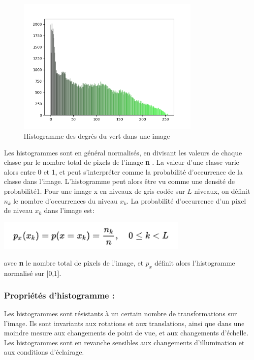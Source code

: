 \documentclass[a4paper,12pt]{report}
\begin{document}
\begin{figure}[ht]
	\centering
	\includegraphics[width=0.8\textwidth]{Figure_1.png}
	\caption{Histogramme des degrés du vert dans une image}
	\label{fig:my_label}
\end{figure}

Les histogrammes sont en général normalisés, en divisant les valeurs de chaque classe par le nombre total de pixels de l'image \textbf{n} . La valeur d'une classe varie alors entre 0 et 1, et peut s'interpréter comme la probabilité d'occurrence de la classe dans l'image. L'histogramme peut alors être vu comme une densité de probabilité1. Pour une image {x} en niveaux de gris codée sur ${\displaystyle L}$ niveaux, on définit $n_k$ le nombre d'occurrences du niveau $x_k$. La probabilité d'occurrence d'un pixel de niveau $x_k$ dans l'image est:
\begin{center}
	\includegraphics[width=0.7\textwidth]{probability.PNG}
\end{center}

avec \textbf{n} le nombre total de pixels de l'image, et $p_x$ définit alors l'histogramme normalisé sur [0,1].

\subsubsection*{Propriétés d'histogramme :}
Les histogrammes sont résistants à un certain nombre de transformations sur l'image. Ils sont invariants aux rotations et aux translations, ainsi que dans une moindre mesure aux changements de point de vue, et aux changements d'échelle. Les histogrammes sont en revanche sensibles aux changements d'illumination et aux conditions d'éclairage.
\end{document}
